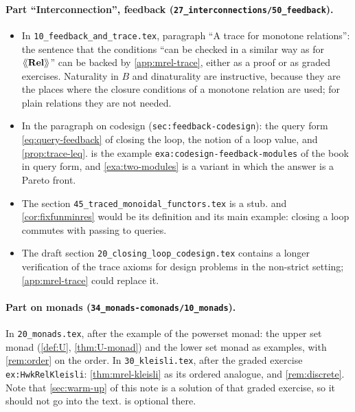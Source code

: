 \documentclass[11pt,a4paper]{article}
\theoremstyle{plain}
\theoremstyle{definition}
\theoremstyle{remark}
\newcommand{\Cat}[1]{\mathbf{#1}}
\newcommand{\Rel}{\Cat{Rel}}
\providecommand{\llangle}{\mathopen{\langle\mkern-3.5mu\langle}}
\providecommand{\rrangle}{\mathclose{\rangle\mkern-3.5mu\rangle}}
\newcommand{\tL}[1]{\llangle #1 \rrangle}
\newcommand{\lbl}[1]{\nolinkurl{#1}}
\newcommand{\file}[1]{\nolinkurl{#1}}
\begin{document}
\paragraph{Part ``Interconnection'', feedback (\file{27_interconnections/50_feedback}).}
\begin{itemize}
    \item In \file{10_feedback_and_trace.tex}, paragraph ``A trace for monotone relations'': the sentence that the conditions ``can be checked in a similar way as for $\tL{\Rel}$'' can be backed by \cref{app:mrel-trace}, either as a proof or as graded exercises. Naturality in $B$ and dinaturality are instructive, because they are the places where the closure conditions of a monotone relation are used; for plain relations they are not needed.
    \item In the paragraph on codesign (\lbl{sec:feedback-codesign}): the query form \cref{eq:query-feedback} of closing the loop, the notion of a loop value, and \cref{prop:trace-leq}.  is the example \lbl{exa:codesign-feedback-modules} of the book in query form, and \cref{exa:two-modules} is a variant in which the answer is a Pareto front.
    \item The section \file{45_traced_monoidal_functors.tex} is a stub.  and \cref{cor:fixfunminres} would be its definition and its main example: closing a loop commutes with passing to queries.
    \item The draft section \file{20_closing_loop_codesign.tex} contains a longer verification of the trace axioms for design problems in the non-strict setting; \cref{app:mrel-trace} could replace it.
\end{itemize}

\paragraph{Part on monads (\file{34_monads-comonads/10_monads}).}
In \file{20_monads.tex}, after the example of the powerset monad: the upper set monad (\cref{def:U}, \cref{thm:U-monad}) and the lower set monad as examples, with \cref{rem:order} on the order.
In \file{30_kleisli.tex}, after the graded exercise \lbl{ex:HwkRelKleisli}: \cref{thm:mrel-kleisli} as its ordered analogue, and \cref{rem:discrete}.
Note that \cref{sec:warm-up} of this note is a solution of that graded exercise, so it should not go into the text.
 is optional there.
\end{document}
